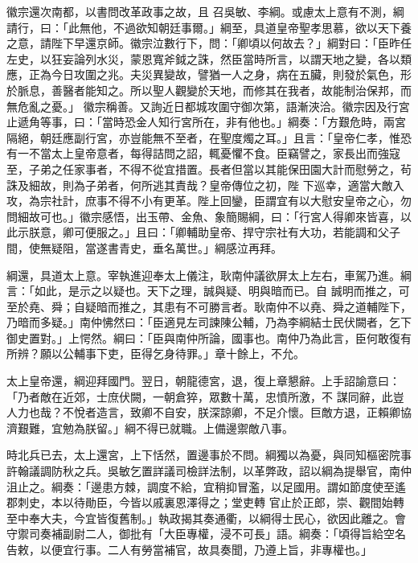 \begin{pinyinscope}
 徽宗還次南都，以書問改革政事之故，且
 召吳敏、李綱。或慮太上意有不測，綱請行，曰：「此無他，不過欲知朝廷事爾。」綱至，具道皇帝聖孝思慕，欲以天下養之意，請陛下早還京師。徽宗泣數行下，問：「卿頃以何故去？」綱對曰：「臣昨任左史，以狂妄論列水災，蒙恩寬斧鉞之誅，然臣當時所言，以謂天地之變，各以類應，正為今日攻圍之兆。夫災異變故，譬猶一人之身，病在五臟，則發於氣色，形於脈息，善醫者能知之。所以聖人觀變於天地，而修其在我者，故能制治保邦，而無危亂之憂。」
 徽宗稱善。又詢近日都城攻圍守御次第，語漸浹洽。徽宗因及行宮止遞角等事，曰：「當時恐金人知行宮所在，非有他也。」綱奏：「方艱危時，兩宮隔絕，朝廷應副行宮，亦豈能無不至者，在聖度燭之耳。」且言：「皇帝仁孝，惟恐有一不當太上皇帝意者，每得詰問之詔，輒憂懼不食。臣竊譬之，家長出而強寇至，子弟之任家事者，不得不從宜措置。長者但當以其能保田園大計而慰勞之，茍誅及細故，則為子弟者，何所逃其責哉？皇帝傳位之初，陛
 下巡幸，適當大敵入攻，為宗社計，庶事不得不小有更革。陛上回鑾，臣謂宜有以大慰安皇帝之心，勿問細故可也。」徽宗感悟，出玉帶、金魚、象簡賜綱，曰：「行宮人得卿來皆喜，以此示朕意，卿可便服之。」且曰：「卿輔助皇帝、捍守宗社有大功，若能調和父子間，使無疑阻，當遂書青史，垂名萬世。」綱感泣再拜。



 綱還，具道太上意。宰執進迎奉太上儀注，耿南仲議欲屏太上左右，車駕乃進。綱言：「如此，是示之以疑也。天下之理，誠與疑、明與暗而已。自
 誠明而推之，可至於堯、舜；自疑暗而推之，其患有不可勝言者。耿南仲不以堯、舜之道輔陛下，乃暗而多疑。」南仲怫然曰：「臣適見左司諫陳公輔，乃為李綱結士民伏闕者，乞下御史置對。」上愕然。綱曰：「臣與南仲所論，國事也。南仲乃為此言，臣何敢復有所辨？願以公輔事下吏，臣得乞身待罪。」章十餘上，不允。



 太上皇帝還，綱迎拜國門。翌日，朝龍德宮，退，復上章懇辭。上手詔諭意曰：「乃者敵在近郊，士庶伏闕，一朝倉猝，眾數十萬，忠憤所激，不
 謀同辭，此豈人力也哉？不悅者造言，致卿不自安，朕深諒卿，不足介懷。巨敵方退，正賴卿協濟艱難，宜勉為朕留。」綱不得已就職。上備邊禦敵八事。



 時北兵已去，太上還宮，上下恬然，置邊事於不問。綱獨以為憂，與同知樞密院事許翰議調防秋之兵。吳敏乞置詳議司檢詳法制，以革弊政，詔以綱為提舉官，南仲沮止之。綱奏：「邊患方棘，調度不給，宜稍抑冒濫，以足國用。謂如節度使至遙郡刺史，本以待勛臣，今皆以戚裏恩澤得之；堂吏轉
 官止於正郎，崇、觀間始轉至中奉大夫，今宜皆復舊制。」執政揭其奏通衢，以綱得士民心，欲因此離之。會守禦司奏補副尉二人，御批有「大臣專權，浸不可長」語。綱奏：「頃得旨給空名告敕，以便宜行事。二人有勞當補官，故具奏聞，乃遵上旨，非專權也。」




\end{pinyinscope}
